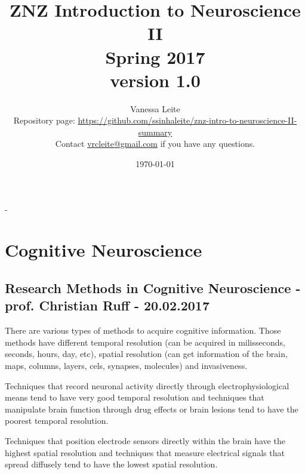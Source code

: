 \documentclass[12pt,article,oneside,a4paper]{memoir}
\title{\textbf{ZNZ Introduction to Neuroscience II} \\
       Spring 2017\\\normalsize version 1.0}
\author{
	Vanessa Leite
	\vspace{2em}
	\\Repository page: \url{https://github.com/ssinhaleite/znz-intro-to-neuroscience-II-summary}\\
	Contact \href{mailto:vrcleite@gmail.com}{vrcleite@gmail.com} if you have any questions.}
\date{\today}
\begin{document}
\frontmatter


\begin{titlingpage}
  \calccentering{\unitlength}
  \begin{adjustwidth*}{\unitlength-24pt}{-\unitlength-24pt}
    \maketitle
  \end{adjustwidth*}
\end{titlingpage}

\mainmatter



\newpage
\clearpage
{}
\setcounter{tocdepth}{3}
\setcounter{secnumdepth}{2}
\tableofcontents

\clearpage
{}

\section{Cognitive Neuroscience}
\subsection{Research Methods in Cognitive Neuroscience - prof. Christian Ruff - 20.02.2017}

There are various types of methods to acquire cognitive information. Those methods have different temporal resolution (can be acquired in milisseconds, seconds, hours, day, etc), spatial resolution (can get information of the brain, maps, columns, layers, cels, synapses, molecules) and invasiveness.

Techniques that record neuronal activity directly through electrophysiological means tend to have very good temporal resolution and techniques that manipulate brain function through drug effects or brain lesions tend to have the poorest temporal resolution.

Techniques that position electrode sensors directly within the brain have the highest spatial resolution and techniques that measure electrical signals that spread diffusely tend to have the lowest spatial resolution.
\end{document}
